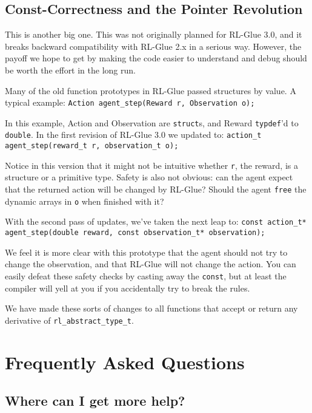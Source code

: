 \documentclass[11pt]{article}
\begin{document}
\subsection{Const-Correctness and the Pointer Revolution}
\label{pointers}
This is another big one.  This was not originally planned for RL-Glue 3.0, and it breaks backward compatibility with RL-Glue
2.x in a serious way.  However, the payoff we hope to get by making the code easier to understand and debug should be 
worth the effort in the long run.

Many of the old function prototypes in RL-Glue passed structures by value.  A typical example:\newline
\texttt{Action agent\_step(Reward r, Observation o);}

In this example, Action and Observation are \texttt{struct}s, and Reward \texttt{typdef}'d to \texttt{double}.  In the 
first revision of RL-Glue 3.0 we updated to:\newline
\texttt{action\_t agent\_step(reward\_t r, observation\_t o);}

Notice in this version that it might not be intuitive whether \texttt{r}, the reward, is a structure or a primitive type.  
Safety is also not obvious: can the agent expect that the returned action will be changed by RL-Glue?  Should the agent 
\texttt{free} the dynamic arrays in \texttt{o} when finished with it? 

With the second pass of updates, we've taken the next leap to:\newline
\texttt{const action\_t* agent\_step(double reward, const observation\_t* observation);}

We feel it is more clear with this prototype that the agent should not try to change the observation, and that 
RL-Glue will not change the action.  You can easily defeat these safety checks by casting away the \texttt{const}, 
but at least the compiler will yell at you if you accidentally try to break the rules.

We have made these sorts of changes to all functions that accept or return any derivative of 
\texttt{rl\_abstract\_type\_t}.





\section{Frequently Asked Questions}
\subsection{Where can I get more help?}
\end{document}
